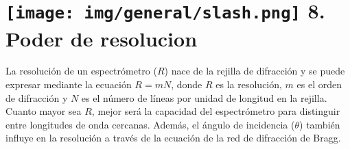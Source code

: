 \documentclass[a0paper,fleqn]{src/betterposter}
\begin{document}
{\section{\texttt{[image: img/general/slash.png]} 8. Poder de resolucion}
La resolución de un espectrómetro ($R$) nace de la rejilla de difracción y se
puede expresar mediante la ecuación $R = mN$, donde $R$ es la resolución, $m$ es
el orden de difracción y $N$ es el número de líneas por unidad de longitud en la
rejilla. Cuanto mayor sea $R$, mejor será la capacidad del espectrómetro para distinguir entre longitudes de onda cercanas. Además, el ángulo de incidencia ($\theta$) también influye en la resolución a través de la ecuación de la red de difracción de Bragg. 

}
\end{document}
